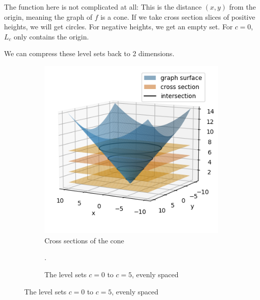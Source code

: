 The function here is not complicated at all: This is the distance $(x,y)$ from the origin, meaning the graph of $f$ is a cone. If we take cross section slices of positive heights, we will get circles. For negative heights, we get an empty set. For $c=0$, $L_c$ only contains the origin.

We can compress these level sets back to 2 dimensions.
\begin{figure}[h]
    \begin{subfigure}[l]{0.46\textwidth}
    \centering
    \includegraphics[width=\textwidth]{Rn_function/cone.png}
    \caption{Cross sections of the cone}
    \end{subfigure}
    \begin{subfigure}[r]{0.5\textwidth} 
\caption{The level sets $c=0$ to $c=5$, evenly spaced}.
    \end{subfigure}
\end{figure}

